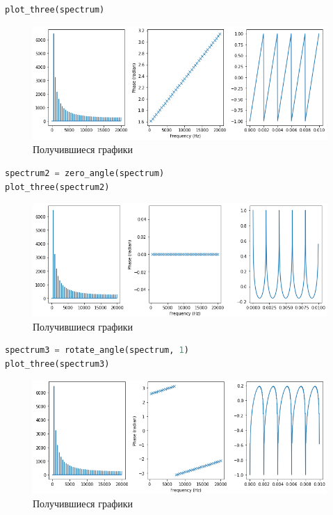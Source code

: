\begin{lstlisting}[language=Python]
plot_three(spectrum)
\end{lstlisting}
\begin{figure}[H]
	\begin{center}
		\includegraphics[scale=0.66]{fig/lab06/lab6_6.png}
		\caption{Получившиеся графики}
	\end{center}
\end{figure}

\begin{lstlisting}[language=Python]
spectrum2 = zero_angle(spectrum)
plot_three(spectrum2)
\end{lstlisting}
\begin{figure}[H]
	\begin{center}
		\includegraphics[scale=0.66]{fig/lab06/lab6_7.png}
		\caption{Получившиеся графики}
	\end{center}
\end{figure}


\begin{lstlisting}[language=Python]
spectrum3 = rotate_angle(spectrum, 1)
plot_three(spectrum3)
\end{lstlisting}
\begin{figure}[H]
	\begin{center}
		\includegraphics[scale=0.66]{fig/lab06/lab6_8.png}
		\caption{Получившиеся графики}
	\end{center}
\end{figure}



